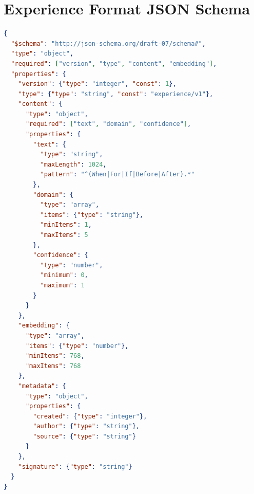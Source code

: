 \section{Experience Format JSON Schema}


\begin{lstlisting}[language=json,caption=Complete JSON Schema]
{
  "$schema": "http://json-schema.org/draft-07/schema#",
  "type": "object",
  "required": ["version", "type", "content", "embedding"],
  "properties": {
    "version": {"type": "integer", "const": 1},
    "type": {"type": "string", "const": "experience/v1"},
    "content": {
      "type": "object",
      "required": ["text", "domain", "confidence"],
      "properties": {
        "text": {
          "type": "string",
          "maxLength": 1024,
          "pattern": "^(When|For|If|Before|After).*"
        },
        "domain": {
          "type": "array",
          "items": {"type": "string"},
          "minItems": 1,
          "maxItems": 5
        },
        "confidence": {
          "type": "number",
          "minimum": 0,
          "maximum": 1
        }
      }
    },
    "embedding": {
      "type": "array",
      "items": {"type": "number"},
      "minItems": 768,
      "maxItems": 768
    },
    "metadata": {
      "type": "object",
      "properties": {
        "created": {"type": "integer"},
        "author": {"type": "string"},
        "source": {"type": "string"}
      }
    },
    "signature": {"type": "string"}
  }
}
\end{lstlisting}

